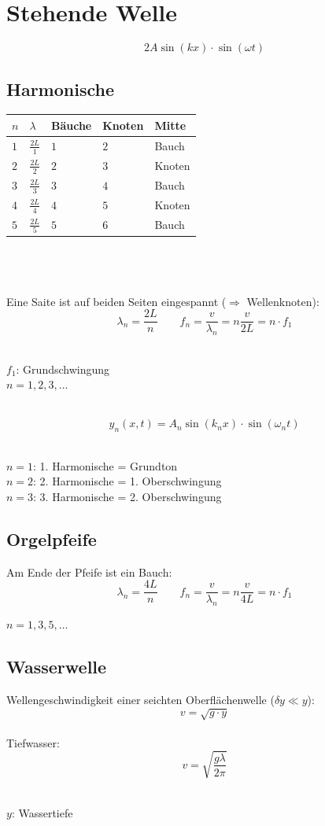 \section{Stehende Welle}
\[\boxed{
	2A\sin(kx) \cdot \sin(\omega t)
}\]


\subsection{Harmonische}
\noindent
\begin{tabular}{|lllll|}
	\hline
	\rowcolor{white} $n$ & $\lambda$ & Bäuche & Knoten & Mitte \\
	\hline
	\rowcolor{lgray} $1$ & $\frac{2 L}{1}$ & $1$ & $2$ & Bauch \\
	\rowcolor{white} $2$ & $\frac{2 L}{2}$ & $2$ & $3$ & Knoten \\
	\rowcolor{lgray} $3$ & $\frac{2 L}{3}$ & $3$ & $4$ & Bauch \\
	\rowcolor{white} $4$ & $\frac{2 L}{4}$ & $4$ & $5$ & Knoten \\
	\rowcolor{lgray} $5$ & $\frac{2 L}{5}$ & $5$ & $6$ & Bauch \\
	\hline
\end{tabular}
\\\\\\
Eine Saite ist auf beiden Seiten eingespannt ($\Rightarrow$ Wellenknoten):
\[
	\lambda_n = \frac{2L}{n} \qquad
	f_n = \frac{v}{\lambda_n} = n \frac{v}{2L} = n \cdot f_1
\]
\\
\begin{footnotesize}
	$f_1$: Grundschwingung\\
	$n=1,2,3,\ldots$
\end{footnotesize}
\\
\[\boxed{
	y_n(x,t)=A_n \sin(k_nx) \cdot \sin(\omega_nt)
}\]
\\
\begin{footnotesize}
	$n=1$: 1. Harmonische = Grundton\\
	$n=2$: 2. Harmonische = 1. Oberschwingung\\
	$n=3$: 3. Harmonische = 2. Oberschwingung\\
\end{footnotesize}

\subsection{Orgelpfeife}
Am Ende der Pfeife ist ein Bauch:
\[
	\lambda_n = \frac{4L}{n} \qquad f_n = \frac{v}{\lambda_n} = n\frac{v}{4L} = n \cdot f_1
\]
\begin{footnotesize}
	$n=1,3,5,\ldots$
\end{footnotesize}


\subsection{Wasserwelle}
Wellengeschwindigkeit einer seichten Oberflächenwelle ($\delta y \ll y$):
\[\boxed{
	v = \sqrt{g \cdot y}
}\]
\\
Tiefwasser:
\[\boxed{
	v = \sqrt{\frac{g \lambda}{2 \pi}}
}\]
\\
\begin{footnotesize}
	$y$: Wassertiefe
\end{footnotesize}
